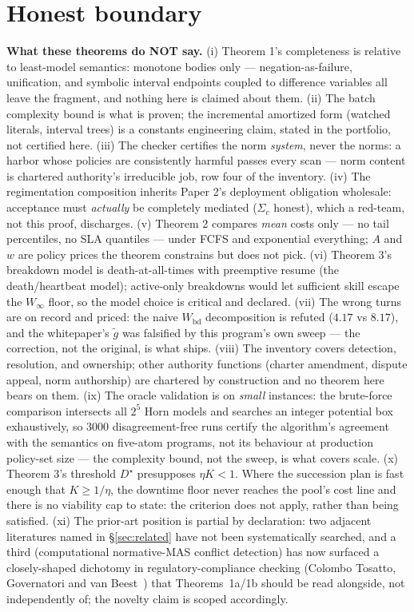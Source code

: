 \documentclass[11pt,a4paper]{article}
\begin{document}
\section{Honest boundary}\label{sec:boundary}
\begin{boundary}
\textbf{What these theorems do NOT say.} (i) Theorem 1's completeness is relative to least-model semantics: monotone bodies only
--- negation-as-failure, unification, and symbolic interval endpoints coupled to difference variables all leave the fragment, and
nothing here is claimed about them. (ii) The batch complexity bound is what is proven; the incremental amortized form (watched
literals, interval trees) is a constants engineering claim, stated in the portfolio, not certified here. (iii) The checker
certifies the norm \emph{system}, never the norms: a harbor whose policies are consistently harmful passes every scan --- norm
content is chartered authority's irreducible job, row four of the inventory. (iv) The regimentation composition inherits Paper
2's deployment obligation wholesale: acceptance must \emph{actually} be completely mediated ($\Sigma_c$ honest), which a
red-team, not this proof, discharges. (v) Theorem 2 compares \emph{mean} costs only --- no tail percentiles, no SLA quantiles ---
under FCFS and exponential everything; $A$ and $w$ are policy prices the theorem constrains but does not pick. (vi) Theorem 3's
breakdown model is death-at-all-times with preemptive resume (the death/heartbeat model); active-only breakdowns would let
sufficient skill escape the $W_\infty$ floor, so the model choice is critical and declared. (vii) The wrong turns are on
record and priced: the naive $W_{\mathrm{bd}}$ decomposition is refuted ($4.17$ vs $8.17$), and the whitepaper's $\tilde g$ was
falsified by this program's own sweep --- the correction, not the original, is what ships. (viii) The inventory covers detection,
resolution, and ownership; other authority functions (charter amendment, dispute appeal, norm authorship) are chartered by
construction and no theorem here bears on them. (ix) The oracle validation is on \emph{small} instances: the brute-force
comparison intersects all $2^5$ Horn models and searches an integer potential box exhaustively, so 3000 disagreement-free runs
certify the algorithm's agreement with the semantics on five-atom programs, not its behaviour at production policy-set size ---
the complexity bound, not the sweep, is what covers scale. (x) Theorem 3's threshold $D^\star$ presupposes $\eta K < 1$. Where
the succession plan is fast enough that $K \ge 1/\eta$, the downtime floor never reaches the pool's cost line and there is no
viability cap to state: the criterion does not apply, rather than being satisfied. (xi) The prior-art position is partial by
declaration: two adjacent literatures named in \S\ref{sec:related} have not been systematically searched, and a third
(computational normative-MAS conflict detection) has now surfaced a closely-shaped dichotomy in regulatory-compliance checking
(Colombo Tosatto, Governatori and van Beest~\cite{ctgvb2020,ctgvb2021}) that Theorems~1a/1b should be read alongside, not
independently of; the novelty claim is scoped accordingly.
\end{boundary}
\end{document}
